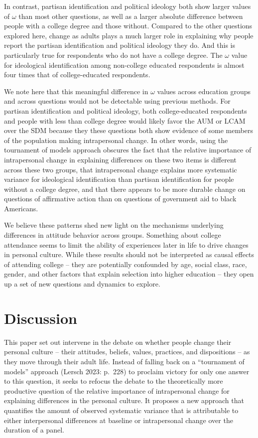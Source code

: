 \documentclass[
  12pt,
]{article}
\begin{document}
In contrast, partisan identification and political ideology both show
larger values of \(\omega\) than most other questions, as well as a
larger absolute difference between people with a college degree and
those without. Compared to the other questions explored here, change as
adults plays a much larger role in explaining why people report the
partisan identification and political ideology they do. And this is
particularly true for respondents who do not have a college degree. The
\(\omega\) value for ideological identification among non-college
educated respondents is almost four times that of college-educated
respondents.

We note here that this meaningful difference in \(\omega\) values across
education groups and across questions would not be detectable using
previous methods. For partisan identification and political ideology,
both college-educated respondents and people with less than college
degree would likely favor the AUM or LCAM over the SDM because they
these questions both show evidence of some members of the population
making intrapersonal change. In other words, using the tournament of
models approach obscures the fact that the relative importance of
intrapersonal change in explaining differences on these two items is
different across these two groups, that intrapersonal change explains
more systematic variance for ideological identification than partisan
identification for people without a college degree, and that there
appears to be more durable change on questions of affirmative action
than on questions of government aid to black Americans.

We believe these patterns shed new light on the mechanisms underlying
differences in attitude behavior across groups. Something about college
attendance seems to limit the ability of experiences later in life to
drive changes in personal culture. While these results should not be
interpreted as causal effects of attending college -- they are
potentially confounded by age, social class, race, gender, and other
factors that explain selection into higher education -- they open up a
set of new questions and dynamics to explore.

\hypertarget{discussion}{%
\section{Discussion}\label{discussion}}

This paper set out intervene in the debate on whether people change
their personal culture -- their attitudes, beliefs, values, practices,
and dispositions -- as they move through their adult life. Instead of
falling back on a ``tournament of models'' approach (Lersch 2023:
p.~228) to proclaim victory for only one answer to this question, it
seeks to refocus the debate to the theoretically more productive
question of the relative importance of intrapersonal change for
explaining differences in the personal culture. It proposes a new
approach that quantifies the amount of observed systematic variance that
is attributable to either interpersonal differences at baseline or
intrapersonal change over the duration of a panel.
\end{document}
